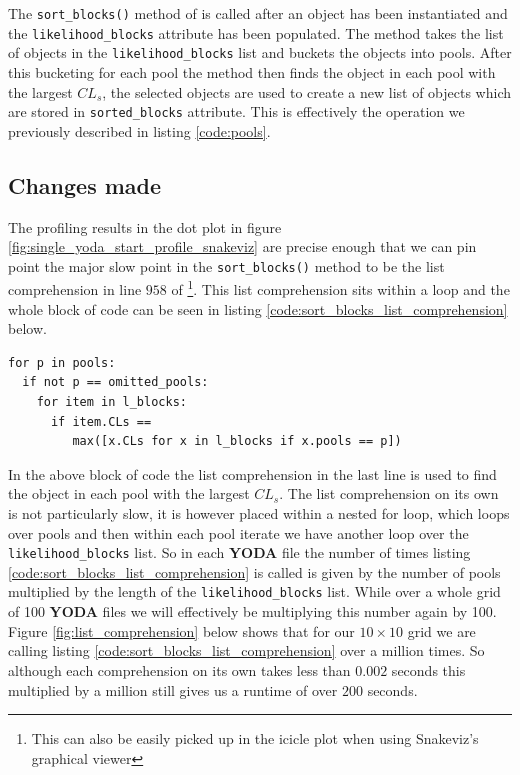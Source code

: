 The \texttt{sort\_blocks()} method of  is called after an object has been instantiated and the \texttt{likelihood\_blocks} attribute has been populated. The method takes the list of  objects in the \texttt{likelihood\_blocks} list and buckets the  objects into pools. After this bucketing for each pool the method then finds the  object in each pool with the largest $CL_{s}$, the selected  objects are used to create a new list of  objects which are stored in  \texttt{sorted\_blocks} attribute. This is effectively the operation we previously described in listing \ref{code:pools}.

\subsection{Changes made}
The profiling results in the dot plot in figure  \ref{fig:single_yoda_start_profile_snakeviz} are precise enough that we can pin point the major slow point in the \texttt{sort\_blocks()} method to be the list comprehension in line $958$ of \footnote{This can also be easily picked up in the icicle plot when using Snakeviz's graphical viewer}. This list comprehension sits within a loop and the whole block of code can be seen in listing \ref{code:sort_blocks_list_comprehension} below.

\begin{code}
\label{code:sort_blocks_list_comprehension}
\begin{verbatim}
for p in pools:
  if not p == omitted_pools:
    for item in l_blocks:
      if item.CLs == 
         max([x.CLs for x in l_blocks if x.pools == p]) 
\end{verbatim}
\end{code}

In the above block of code the list comprehension in the last line is used to find the  object in each pool with the largest $CL_s$. The list comprehension on its own is not particularly slow, it is however  placed within a nested for loop, which loops over pools and then within each pool iterate we have another loop over the \texttt{likelihood\_blocks} list. So in each \textbf{YODA} file the number of times listing \ref{code:sort_blocks_list_comprehension} is called is given by the number of pools multiplied by the length of the \texttt{likelihood\_blocks} list. While over a whole grid of 100 \textbf{YODA} files we will effectively be multiplying this number again by 100. Figure \ref{fig:list_comprehension} below shows that for our $10\times 10$ grid we are calling listing \ref{code:sort_blocks_list_comprehension} over a million times. So although each comprehension on its own takes less than $0.002$ seconds this multiplied by a million still gives us a runtime of over $200$ seconds.  

